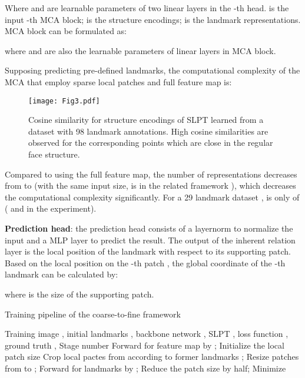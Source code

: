 \documentclass[10pt,twocolumn,letterpaper]{article}
\begin{document}
Where  and  are learnable parameters of two linear layers in the -th head.  is the input -th MCA block;  is the structure encodings;  is the landmark representations. MCA block can be formulated as:

where  and  are also the learnable parameters of linear layers in MCA block.

Supposing predicting  pre-defined landmarks, the computational complexity of the MCA that employ sparse local patches  and full feature map  is:
\begin{figure}[t!]
	\centering
	\texttt{[image: Fig3.pdf]}
	\caption{Cosine similarity for structure encodings of SLPT learned from a dataset with 98 landmark annotations. High cosine similarities are observed for the corresponding points which are close in the regular face structure.}
	\label{fig3}
\end{figure}


Compared to using the full feature map, the number of representations decreases from  to  (with the same input size,  is  in the related framework \cite{DETR}), which decreases the computational complexity significantly. For a 29 landmark dataset \cite{COFW},   is only  of  ( and  in the experiment).

\textbf{Prediction head}: the prediction head consists of a layernorm to normalize the input and a MLP layer to predict the result. The output of the inherent relation layer is the local position of the landmark with respect to its supporting patch. Based on the local position on the -th patch , the global coordinate of the -th landmark  can be calculated by:

where  is the size of the supporting patch.

\begin{algorithm}[t!]
\caption{Training pipeline of the coarse-to-fine framework}
	\label{alg1}
	\begin{algorithmic}[1]
		\REQUIRE Training image , initial landmarks , backbone network , SLPT , loss function , ground truth , Stage number 
		\STATE Forward  for feature map by ;
		\STATE Initialize the local patch size 
		\FOR{   1 \TO  }
		\STATE Crop local pactes  from  according to former landmarks ;
		\STATE Resize patches from  to ;
		\STATE Forward  for landmarks by ;
		\STATE Reduce the patch size  by half;
		\ENDFOR
		\STATE Minimize 
		\ENDWHILE
	\end{algorithmic} 
\end{algorithm}
\end{document}
